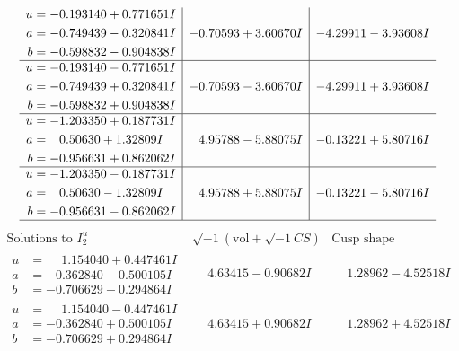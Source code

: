 \documentclass[1p]{elsarticle_modified}
\theoremstyle{definition}
\newcommand{\I}{\sqrt{-1}}
\begin{document}
$$\begin{array}{c|c|c}
\begin{aligned}
u &= -0.193140 + 0.771651 I \\
a &= -0.749439 - 0.320841 I \\
b &= -0.598832 - 0.904838 I\end{aligned}
 & -0.70593 + 3.60670 I & -4.29911 - 3.93608 I \\ \hline\begin{aligned}
u &= -0.193140 - 0.771651 I \\
a &= -0.749439 + 0.320841 I \\
b &= -0.598832 + 0.904838 I\end{aligned}
 & -0.70593 - 3.60670 I & -4.29911 + 3.93608 I \\ \hline\begin{aligned}
u &= -1.203350 + 0.187731 I \\
a &= \phantom{-}0.50630 + 1.32809 I \\
b &= -0.956631 + 0.862062 I\end{aligned}
 & \phantom{-}4.95788 - 5.88075 I & -0.13221 + 5.80716 I \\ \hline\begin{aligned}
u &= -1.203350 - 0.187731 I \\
a &= \phantom{-}0.50630 - 1.32809 I \\
b &= -0.956631 - 0.862062 I\end{aligned}
 & \phantom{-}4.95788 + 5.88075 I & -0.13221 - 5.80716 I\\
 \hline 
 \end{array}$$\newpage$$\begin{array}{c|c|c}  
\text{Solutions to }I^u_{2}& \I (\text{vol} + \sqrt{-1}CS) & \text{Cusp shape}\\
 \hline 
\begin{aligned}
u &= \phantom{-}1.154040 + 0.447461 I \\
a &= -0.362840 - 0.500105 I \\
b &= -0.706629 - 0.294864 I\end{aligned}
 & \phantom{-}4.63415 - 0.90682 I & \phantom{-}1.28962 - 4.52518 I \\ \hline\begin{aligned}
u &= \phantom{-}1.154040 - 0.447461 I \\
a &= -0.362840 + 0.500105 I \\
b &= -0.706629 + 0.294864 I\end{aligned}
 & \phantom{-}4.63415 + 0.90682 I & \phantom{-}1.28962 + 4.52518 I \\ \hline\begin{aligned}

\end{aligned}
\end{array}$$
\end{document}
